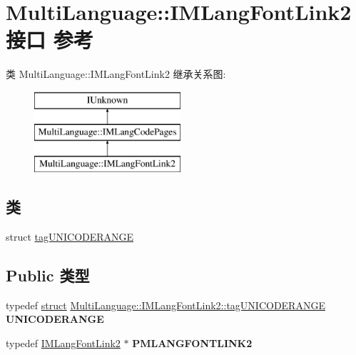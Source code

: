 \hypertarget{interface_multi_language_1_1_i_m_lang_font_link2}{}\section{Multi\+Language\+:\+:I\+M\+Lang\+Font\+Link2接口 参考}
\label{interface_multi_language_1_1_i_m_lang_font_link2}
类 Multi\+Language\+:\+:I\+M\+Lang\+Font\+Link2 继承关系图\+:\begin{figure}[H]
\begin{center}
\leavevmode
\includegraphics[height=3.000000cm]{interface_multi_language_1_1_i_m_lang_font_link2}
\end{center}
\end{figure}
\subsection*{类}
\begin{DoxyCompactItemize}
\item 
struct \hyperlink{struct_multi_language_1_1_i_m_lang_font_link2_1_1tag_u_n_i_c_o_d_e_r_a_n_g_e}{tag\+U\+N\+I\+C\+O\+D\+E\+R\+A\+N\+GE}
\end{DoxyCompactItemize}
\subsection*{Public 类型}
\begin{DoxyCompactItemize}
\item 
\mbox{\label{interface_multi_language_1_1_i_m_lang_font_link2_a8f621b0c3313eabd6ab296b2ef37ac89}} 
typedef \hyperlink{interfacestruct}{struct} \hyperlink{struct_multi_language_1_1_i_m_lang_font_link2_1_1tag_u_n_i_c_o_d_e_r_a_n_g_e}{Multi\+Language\+::\+I\+M\+Lang\+Font\+Link2\+::tag\+U\+N\+I\+C\+O\+D\+E\+R\+A\+N\+GE} {\bfseries U\+N\+I\+C\+O\+D\+E\+R\+A\+N\+GE}
\item 
\mbox{\label{interface_multi_language_1_1_i_m_lang_font_link2_ade719d1da1303014584c8e3669c8ceca}} 
typedef \hyperlink{interface_multi_language_1_1_i_m_lang_font_link2}{I\+M\+Lang\+Font\+Link2} $\ast$ {\bfseries P\+M\+L\+A\+N\+G\+F\+O\+N\+T\+L\+I\+N\+K2}
\end{DoxyCompactItemize}
